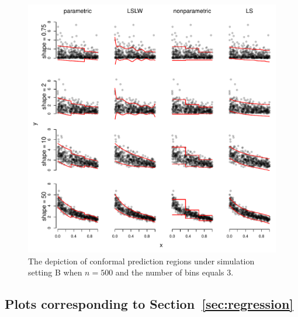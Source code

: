 \documentclass[11pt]{article}\usepackage[]{graphicx}\usepackage[]{color}
\makeatletter
\def\maxwidth{ %
  \ifdim\Gin@nat@width>\linewidth
    \linewidth
  \else
    \Gin@nat@width
  \fi
}
\newenvironment{knitrout}{}{} %
\makeatother
\begin{document}
\newpage
\begin{figure}[h!]
\begin{center}
\begin{knitrout}
\color{fgcolor}
\includegraphics[width=\maxwidth]{figure/conformal-plots-B-500-1} 

\end{knitrout}
\end{center}
\caption{The depiction of conformal prediction regions under simulation 
  setting B when $n = 500$ and the number of bins equals 3.
}
\label{conformal-plots-B-500}
\end{figure}









\newpage
\subsection{Plots corresponding to Section~\ref{sec:regression}}
\label{sec:regressionplots}
\end{document}
